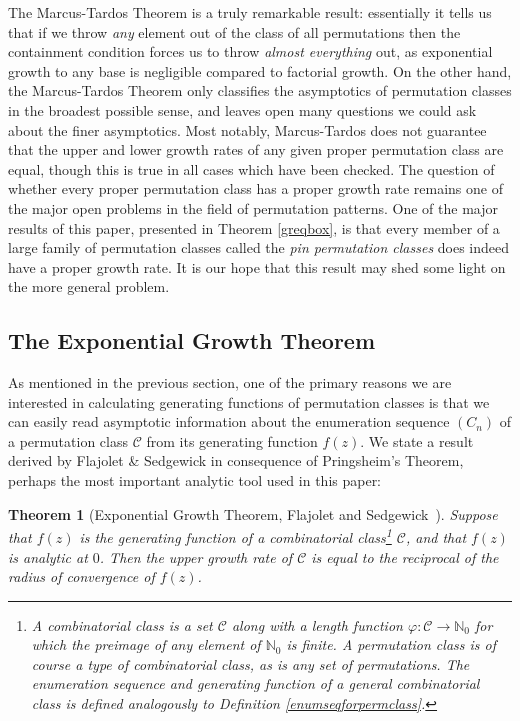 \documentclass[11pt,a4paper]{article}
\newtheorem{thm}{Theorem}[section]
\theoremstyle{definition}
\begin{document}
The Marcus-Tardos Theorem is a truly remarkable result: essentially it tells us that if we throw \emph{any} element out of the class of all permutations then the containment condition forces us to throw \emph{almost everything} out, as exponential growth to any base is negligible compared to factorial growth. On the other hand, the Marcus-Tardos Theorem only classifies the asymptotics of permutation classes in the broadest possible sense, and leaves open many questions we could ask about the finer asymptotics. Most notably, Marcus-Tardos does not guarantee that the upper and lower growth rates of any given proper permutation class are equal, though this is true in all cases which have been checked. The question of whether every proper permutation class has a proper growth rate remains one of the major open problems in the field of permutation patterns. One of the major results of this paper, presented in Theorem \ref{greqbox}, is that every member of a large family of permutation classes called the \emph{pin permutation classes} does indeed have a proper growth rate. It is our hope that this result may shed some light on the more general problem.

\subsection{The Exponential Growth Theorem} \label{sec:1.2}

As mentioned in the previous section, one of the primary reasons we are interested in calculating generating functions of permutation classes is that we can easily read asymptotic information about the enumeration sequence $(C_{n})$ of a permutation class $\mathcal{C}$ from its generating function $f(z)$. We state a result derived by Flajolet \& Sedgewick in consequence of Pringsheim's Theorem, perhaps the most important analytic tool used in this paper:

\begin{thm}[Exponential Growth Theorem, {Flajolet and Sedgewick~\cite{flajolet:analytic-combin:}}]\label{EGT0}
Suppose that $f(z)$ is the generating function of a combinatorial class\footnote{A \emph{combinatorial class} is a set $\mathcal{C}$ along with a length function $\varphi: \mathcal{C} \rightarrow \mathbb{N}_{0}$ for which the preimage of any element of $\mathbb{N}_{0}$ is finite. A permutation class is of course a type of combinatorial class, as is any set of permutations. The enumeration sequence and generating function of a general combinatorial class is defined analogously to Definition \ref{enumseqforpermclass}.} $\mathcal{C}$, and that $f(z)$ is analytic at $0$. Then the upper growth rate of $\mathcal{C}$ is equal to the reciprocal of the radius of convergence of $f(z)$. 
\end{thm}
\end{document}
